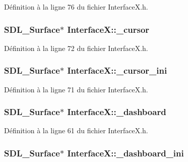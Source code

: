 Définition à la ligne 76 du fichier InterfaceX.h.

\hypertarget{a00011_aa88f07cc32a1794d03eb64a52057e093}{
\subsubsection[{\_\-cursor}]{\setlength{\rightskip}{0pt plus 5cm}SDL\_\-Surface$\ast$ {\bf InterfaceX::\_\-cursor}}}
\label{a00011_aa88f07cc32a1794d03eb64a52057e093}


Définition à la ligne 72 du fichier InterfaceX.h.

\hypertarget{a00011_aa2ea2d74e3d3e4e9955b2c52b0e41cbc}{
\subsubsection[{\_\-cursor\_\-ini}]{\setlength{\rightskip}{0pt plus 5cm}SDL\_\-Surface$\ast$ {\bf InterfaceX::\_\-cursor\_\-ini}}}
\label{a00011_aa2ea2d74e3d3e4e9955b2c52b0e41cbc}


Définition à la ligne 71 du fichier InterfaceX.h.

\hypertarget{a00011_adb0cbbbfa65c44ec89b8eb1b94fd0b5d}{
\subsubsection[{\_\-dashboard}]{\setlength{\rightskip}{0pt plus 5cm}SDL\_\-Surface$\ast$ {\bf InterfaceX::\_\-dashboard}}}
\label{a00011_adb0cbbbfa65c44ec89b8eb1b94fd0b5d}


Définition à la ligne 61 du fichier InterfaceX.h.

\hypertarget{a00011_adc79d6b99c7934e04606c0734f535a34}{
\subsubsection[{\_\-dashboard\_\-ini}]{\setlength{\rightskip}{0pt plus 5cm}SDL\_\-Surface$\ast$ {\bf InterfaceX::\_\-dashboard\_\-ini}}}
\label{a00011_adc79d6b99c7934e04606c0734f535a34}


